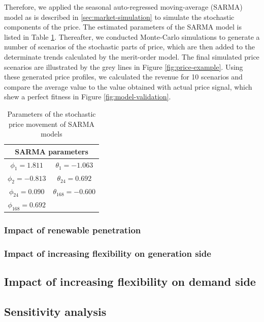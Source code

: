 Therefore, we applied the seasonal auto-regressed moving-average (SARMA) model as is described in \ref{sec:market-simulation} to simulate the stochastic components of the price. The estimated parameters of the SARMA model is listed in Table \ref{tab:SARMA}. Thereafter, we conducted Monte-Carlo simulations to generate a number of scenarios of the stochastic parts of price, which are then added to the determinate trends calculated by the merit-order model. The final simulated price scenarios are illustrated by the grey lines in Figure \ref{fig:price-example}. Using these generated price profiles, we calculated the revenue for 10 scenarios and compare the average value to the value obtained with actual price signal, which shew a perfect fitness in Figure \ref{fig:model-validation}. 

\begin{table}
	\label{tab:SARMA}
	\centering
	\begin{tabular}{|c c|}
		\hline
		\multicolumn{2}{|c|}{SARMA parameters}\\
		\hline
		\hline
		$\phi_1 = 1.811$ & $\theta_1 = -1.063$ \\
		$\phi_2 = -0.813$ & $\theta_{24} =0.692$ \\
		$\phi_{24} = 0.090$ & $\theta_{168} = -0.600$ \\
		$\phi_{168} = 0.692$ & \\
		\hline
	\end{tabular}
\caption{Parameters of the stochastic price movement of SARMA models}
\end{table}

\newpage
\subsubsection{Impact of renewable penetration}

\subsubsection{Impact of increasing flexibility on generation side}

\subsection{Impact of increasing flexibility on demand side}

\subsection{Sensitivity analysis}
